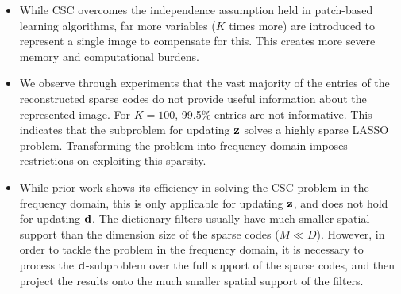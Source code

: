 \begin{itemize}
  \item While CSC overcomes the independence assumption held in
    patch-based learning algorithms, far more variables ($K$ times
    more) are introduced to represent a single image to compensate for
    this. This creates more severe memory and computational burdens.

  \item We observe through experiments that the vast majority of the
    entries of the reconstructed sparse codes do not provide useful
    information about the represented image. For $K=100$, 99.5\%
    entries are not informative. This indicates that the subproblem
    for updating $\code$ solves a highly sparse LASSO
    problem. Transforming the problem into frequency domain imposes
    restrictions on exploiting this sparsity.
    
  \item While prior work shows its efficiency in solving the CSC
    problem in the frequency domain, this is only applicable for
    updating $\code$, and does not hold for updating $\filter$. The
    dictionary filters usually have much smaller spatial support than
    the dimension size of the sparse codes ($M \ll D$). However, in
    order to tackle the problem in the frequency domain, it is
    necessary to process the $\filter$-subproblem over the full
    support of the sparse codes, and then project the results onto the
    much smaller spatial support of the filters.
\end{itemize}



